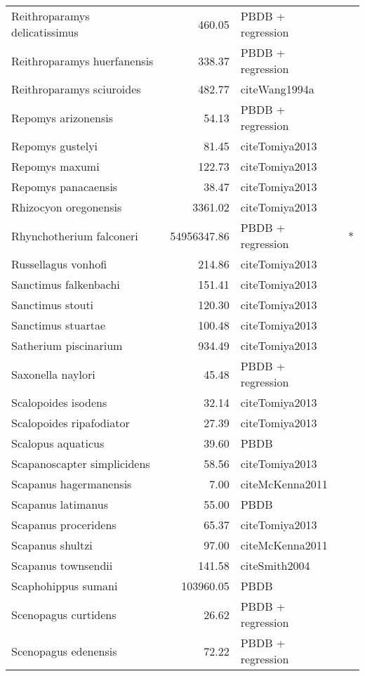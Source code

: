 \begin{table}[ht]
\begin{tabular}{lrll}
  Reithroparamys delicatissimus & 460.05 & PBDB + regression &  \\ 
  Reithroparamys huerfanensis & 338.37 & PBDB + regression &  \\ 
  Reithroparamys sciuroides & 482.77 & cite{Wang1994a} &  \\ 
  Repomys arizonensis & 54.13 & PBDB + regression &  \\ 
  Repomys gustelyi & 81.45 & cite{Tomiya2013} &  \\ 
  Repomys maxumi & 122.73 & cite{Tomiya2013} &  \\ 
  Repomys panacaensis & 38.47 & cite{Tomiya2013} &  \\ 
  Rhizocyon oregonensis & 3361.02 & cite{Tomiya2013} &  \\ 
  Rhynchotherium falconeri & 54956347.86 & PBDB + regression & * \\ 
  Russellagus vonhofi & 214.86 & cite{Tomiya2013} &  \\ 
  Sanctimus falkenbachi & 151.41 & cite{Tomiya2013} &  \\ 
  Sanctimus stouti & 120.30 & cite{Tomiya2013} &  \\ 
  Sanctimus stuartae & 100.48 & cite{Tomiya2013} &  \\ 
  Satherium piscinarium & 934.49 & cite{Tomiya2013} &  \\ 
  Saxonella naylori & 45.48 & PBDB + regression &  \\ 
  Scalopoides isodens & 32.14 & cite{Tomiya2013} &  \\ 
  Scalopoides ripafodiator & 27.39 & cite{Tomiya2013} &  \\ 
  Scalopus aquaticus & 39.60 & PBDB &  \\ 
  Scapanoscapter simplicidens & 58.56 & cite{Tomiya2013} &  \\ 
  Scapanus hagermanensis & 7.00 & cite{McKenna2011} &  \\ 
  Scapanus latimanus & 55.00 & PBDB &  \\ 
  Scapanus proceridens & 65.37 & cite{Tomiya2013} &  \\ 
  Scapanus shultzi & 97.00 & cite{McKenna2011} &  \\ 
  Scapanus townsendii & 141.58 & cite{Smith2004} &  \\ 
  Scaphohippus sumani & 103960.05 & PBDB &  \\ 
  Scenopagus curtidens & 26.62 & PBDB + regression &  \\ 
  Scenopagus edenensis & 72.22 & PBDB + regression &  \\ 

\end{tabular}
\end{table}
